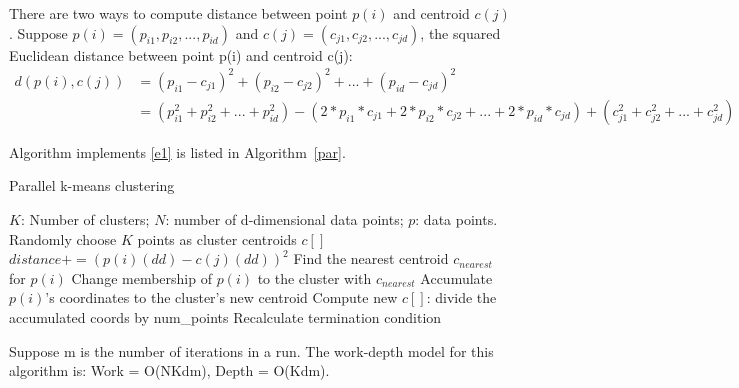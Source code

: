 \documentclass{article}
\begin{document}
There are two ways to compute distance between point $p(i)$
and centroid $c(j)$. Suppose $p(i) = (p_{i1}, p_{i2}, ..., p_{id})$ and $c(j) = (c_{j1},
c_{j2}, ..., c_{jd})$, the squared Euclidean distance between point p(i) and centroid c(j): 
\begin{align}
d(p(i),c(j)) &= (p_{i1} - c_{j1})^2 + (p_{i2} - c_{j2})^2 + ... + (p_{id} - c_{jd})^2 \label{e1}\\
&= (p_{i1}^2 + p_{i2}^2 + ... + p_{id}^2) - (2*p_{i1}*c_{j1} + 2*p_{i2}*c_{j2} + ... + 2*p_{id}*c_{jd})
+ (c_{j1}^2 + c_{j2}^2 + ... + c_{jd}^2) \label{e2}
\end{align}

Algorithm implements \ref{e1} is listed in Algorithm~\ref{par}. 
\begin{algorithm}[!htp]
  \caption{Parallel k-means clustering} \label{par}
  \begin{algorithmic}[1]
    \INPUT $K$: Number of clusters; $N$: number of d-dimensional data points; $p$: data points.
     \label{alg:p}
    \State Randomly choose $K$ points as cluster centroids $c[]$
    \State $distance += (p(i)(dd) - c(j)(dd))^2$
    \EndFor
    \EndFor
    \State Find the nearest centroid $c_{nearest}$ for $p(i)$
    \State Change membership of $p(i)$ to the cluster with $c_{nearest}$
    \State Accumulate $p(i)$'s coordinates to the cluster's new centroid
    \EndParFor
    \State Compute new $c[]$: divide the accumulated coords by num\_points
    \State Recalculate termination condition
    \EndWhile
    \EndFunction  
  \end{algorithmic}
\end{algorithm}
Suppose m is the number of iterations in a run. The work-depth model for this algorithm is:
Work = O(NKdm), Depth = O(Kdm).
\end{document}

